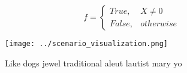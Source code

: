 \documentclass[a4paper]{article}
\begin{document}
\begin{equation}   f =
\begin{cases} True, & X \neq 0\\
False, & otherwise
\end{cases}
\end{equation}

\begin{figure}
\centering
\texttt{[image: ../scenario\_visualization.png]}
\caption{Like dogs jewel traditional aleut lautist mary yo
}
\end{figure}
 
\end{document}
